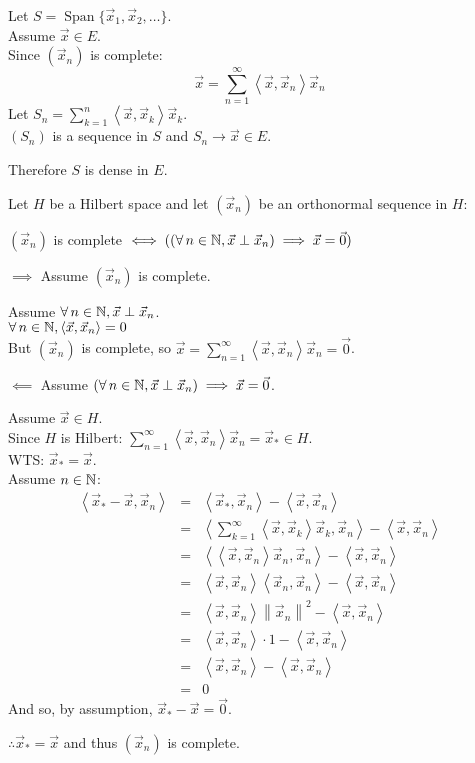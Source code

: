 \documentclass[letterpaper,12pt,fleqn]{article}
\newcommand{\vx}{\vec{x}}
\newcommand{\vo}{\vec{0}}
\newcommand{\norm}[1]{\left\|#1\right\|}
\newcommand{\inner}[1]{\left<#1\right>}
\DeclareMathOperator{\spn}{Span}
\begin{document}
\begin{theproof}
  Let $S=\spn\{\vx_1,\vx_2,\ldots\}$. \\
  Assume $\vx\in E$. \\
  Since $(\vx_n)$ is complete:
  \[\vx=\sum_{n=1}^{\infty}\inner{\vx,\vx_n}\vx_n\]
  Let $S_n=\sum_{k=1}^n\inner{\vx,\vx_k}\vx_k$. \\
  $(S_n)$ is a sequence in $S$ and $S_n\to\vx\in E$.

  Therefore $S$ is dense in $E$.
\end{theproof}

\begin{theorem}
  Let $H$ be a Hilbert space and let $(\vx_n)$ be an orthonormal sequence in
  $H$:

  \qquad$(\vx_n)$ is complete
  $\iff((\forall\,n\in\N,\vx\perp\vx_n)\implies\vx=\vo)$
\end{theorem}

\begin{theproof}
  \listbreak
  \begin{description}
  \item $\implies$ Assume $(\vx_n)$ is complete.

    Assume $\forall\,n\in\N,\vx\perp\vx_n$. \\
    $\forall\,n\in\N,\inner{\vx,\vx_n}=0$ \\
    But $(\vx_n)$ is complete, so
    $\vx=\sum_{n=1}^{\infty}\inner{\vx,\vx_n}\vx_n=\vo$.

  \item $\impliedby$ Assume $(\forall\,n\in\N,\vx\perp\vx_n)\implies\vx=\vo$.

    Assume $\vx\in H$. \\
    Since $H$ is Hilbert:
    $\sum_{n=1}^{\infty}\inner{\vx,\vx_n}\vx_n=\vx_*\in H$. \\
    WTS: $\vx_*=\vx$. \\
    Assume $n\in\mathbb{N}$:
    \begin{eqnarray*}
      \inner{\vx_*-\vx,\vx_n} &=& \inner{\vx_*,\vx_n}-\inner{\vx,\vx_n} \\
      &=& \inner{\sum_{k=1}^{\infty}\inner{\vx,\vx_k}\vx_k,\vx_n}-
      \inner{\vx,\vx_n} \\
      &=& \inner{\inner{\vx,\vx_n}\vx_n,\vx_n}-\inner{\vx,\vx_n} \\
      &=& \inner{\vx,\vx_n}\inner{\vx_n,\vx_n}-\inner{\vx,\vx_n} \\
      &=& \inner{\vx,\vx_n}\norm{\vx_n}^2-\inner{\vx,\vx_n} \\
      &=& \inner{\vx,\vx_n}\cdot1-\inner{\vx,\vx_n} \\
      &=& \inner{\vx,\vx_n}-\inner{\vx,\vx_n} \\
      &=& 0
    \end{eqnarray*}
    And so, by assumption, $\vx_*-\vx=\vo$.

    $\therefore\vx_*=\vx$ and thus $(\vx_n)$ is complete.
  \end{description}
\end{theproof}
\end{document}
